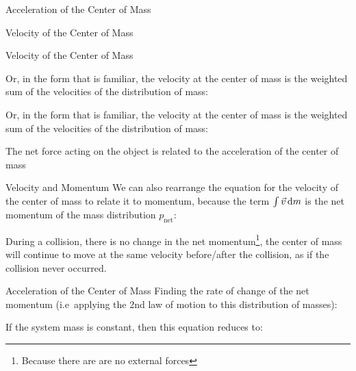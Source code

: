 \documentclass[12pt,compress,aspectratio=169]{beamer}
\begin{document}
\begin{frame}{Acceleration of the Center of Mass}
{\begin{frame}{Velocity of the Center of Mass}
{\begin{frame}{Velocity of the Center of Mass}

  Or, in the form that is familiar, the velocity at the center of mass is the
  weighted sum of the velocities of the distribution of mass:
  

  Or, in the form that is familiar, the velocity at the center of mass is the
  weighted sum of the velocities of the distribution of mass:
  

  The net force acting on the object is related to the acceleration of the
  center of mass
\end{frame}



\begin{frame}{Velocity and Momentum}
  We can also rearrange the equation for the velocity of the center of mass to
  relate it to momentum, because the term $\int\vec v\dl m$ is the net momentum
  of the mass distribution $p_\text{net}$:
  

  During a collision, there is no change in the net momentum\footnote{Because
  there are are no external forces}, the center of mass will continue to move
  at the same velocity before/after the collision, as if the collision never
  occurred.
\end{frame}



\begin{frame}{Acceleration of the Center of Mass}
  Finding the rate of change of the net momentum (i.e\ applying the 2nd law of
  motion to this distribution of masses):
  

  If the system mass is constant, then this equation reduces to:

  

\end{frame}}
\end{frame}}
\end{frame}
\end{document}

